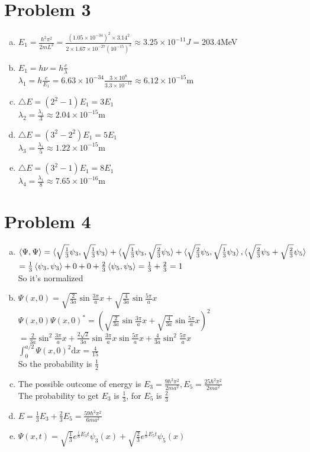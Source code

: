 \documentclass[a4paper]{article}
\begin{document}
\section{Problem 3}
\begin{enumerate}[(a)]
    \item $E_1=\frac{\hbar^2\pi^2}{2mL^2}=\frac{(1.05\times10^{-34})^2\times3.14^2}{2\times1.67\times10^{-27}(10^{-15})^2}\approx3.25\times10^{-11}J=203.4$MeV
    \item $E_1=h\nu=h\frac{c}{\lambda}$
    \\$\lambda_1=h\frac{c}{E_1}=6.63\times10^{-34}\frac{3\times10^8}{3.3\times10^{-11}}\approx6.12\times10^{-15}$m
    \item $\bigtriangleup E=(2^2-1)E_1=3E_1$
    \\$\lambda_2=\frac{\lambda_1}{3}\approx2.04\times10^{-15}$m
    \item $\bigtriangleup E=(3^2-2^2)E_1=5E_1$
    \\$\lambda_3=\frac{\lambda_1}{5}\approx1.22\times10^{-15}$m
    \item $\bigtriangleup E=(3^2-1)E_1=8E_1$
    \\$\lambda_4=\frac{\lambda_1}{8}\approx7.65\times10^{-16}$m
\end{enumerate}
\section{Problem 4}
\begin{enumerate}[(a)]
    \item $\braket{\Psi,\Psi}=\braket{\sqrt{\frac{1}{3}}\psi_3,\sqrt{\frac{1}{3}}\psi_3}+\braket{\sqrt{\frac{1}{3}}\psi_3,\sqrt{\frac{2}{3}}\psi_5}+\braket{\sqrt{\frac{2}{3}}\psi_5,\sqrt{\frac{1}{3}}\psi_3},\braket{\sqrt{\frac{2}{3}}\psi_5+\sqrt{\frac{2}{3}}\psi_5}$
    \\$=\frac{1}{3}\braket{\psi_3,\psi_3}+0+0+\frac{2}{3}\braket{\psi_5,\psi_5}=\frac{1}{3}+\frac{2}{3}=1$
    \\So it's normalized
    \item $\Psi(x,0)=\sqrt{\frac{2}{3a}}\sin\frac{3\pi}{a}x+\sqrt{\frac{4}{3a}}\sin\frac{5\pi}{a}x$
    \\$\Psi(x,0)\Psi(x,0)^*=(\sqrt{\frac{2}{3a}}\sin\frac{3\pi}{a}x+\sqrt{\frac{4}{3a}}\sin\frac{5\pi}{a}x)^2$
    \\$=\frac{2}{3a}\sin^2\frac{3\pi}{a}x+\frac{2\sqrt{2}}{3a}\sin\frac{3\pi}{a}x\sin\frac{5\pi}{a}x+\frac{4}{3a}\sin^2\frac{5\pi}{a}x$
    \\$\int_0^{a/2}\Psi(x,0)^2\mathrm{d}x=\frac{4}{15}$
    \\So the probability is $\frac{1}{2}$
    \item The possible outcome of energy is $E_3=\frac{9\hbar^2\pi^2}{2ma^2},E_5=\frac{25\hbar^2\pi^2}{2ma^2}$
    \\The probability to get $E_3$ is $\frac{1}{3}$, for $E_5$ is $\frac{2}{3}$
    \item $E=\frac{1}{3}E_3+\frac{2}{3}E_5=\frac{59\hbar^2\pi^2}{6ma^2}$
    \item $\Psi(x,t)=\sqrt{\frac{1}{3}}e^{\frac{i}{\hbar}E_3t}\psi_3(x)+\sqrt{\frac{2}{3}}e^{\frac{i}{\hbar}E_5t}\psi_5(x)$
\end{enumerate}
\end{document}
